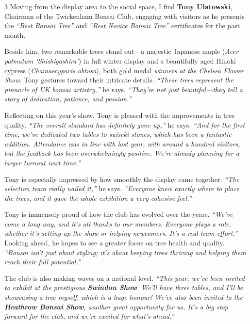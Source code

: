 \begin{multicols}{3}
\medskip
{}
\noindent
Moving from the display area to the social space, I find \textbf{Tony Ulatowski}, Chairman of the Twickenham Bonsai Club, engaging with visitors as he presents the \textit{``Best Bonsai Tree''} and \textit{``Best Novice Bonsai Tree''} certificates for the past month.

Beside him, two remarkable trees stand out---a majestic Japanese maple (\textit{Acer palmatum `Shishigashira'}) in full winter display and a beautifully aged Hinoki cypress (\textit{Chamaecyparis obtusa}), both gold medal \textit{winners at the Chelsea Flower Show}.
Tony gestures toward their intricate details. \textit{``These trees represent the pinnacle of UK bonsai artistry,''} he says. 
\textit{``They're not just beautiful---they tell a story of dedication, patience, and passion.''}

Reflecting on this year's show, Tony is pleased with the improvements in tree quality. 
\textit{``The overall standard has definitely gone up,''} he says. 
\textit{``And for the first time, we've dedicated two tables to suiseki stones, which has been a fantastic addition. Attendance was in line with last year, with around a hundred visitors, but the feedback has been overwhelmingly positive. We're already planning for a larger turnout next time.''}

Tony is especially impressed by how smoothly the display came together. \textit{``The selection team really nailed it,''} he says. \textit{``Everyone knew exactly where to place the trees, and it gave the whole exhibition a very cohesive feel.''}

Tony is immensely proud of how the club has evolved over the years. \textit{``We've come a long way, and it's all thanks to our members. Everyone plays a role, whether it's setting up the show or helping newcomers. It's a real team effort.''} Looking ahead, he hopes to see a greater focus on tree health and quality. \textit{``Bonsai isn't just about styling; it's about keeping trees thriving and helping them reach their full potential.''}

The club is also making waves on a national level. \textit{``This year, we've been invited to exhibit at the prestigious \textbf{Swindon Show}. We'll have three tables, and I'll be showcasing a tree myself, which is a huge honour! We've also been invited to the \textbf{Heathrow Bonsai Show}, another great opportunity for us. It's a big step forward for the club, and we're excited for what's ahead.''}


\end{multicols}
